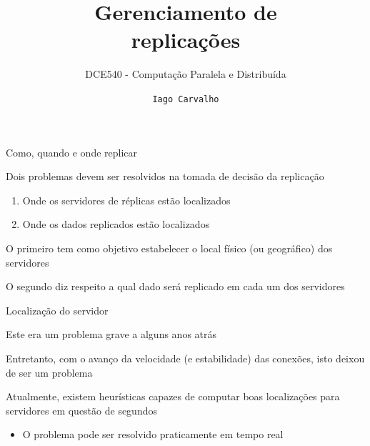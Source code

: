 \documentclass[compress]{beamer}
\title{Gerenciamento de \\ replicações}
\subtitle{DCE540 - Computação Paralela e Distribuída}
\author{\texttt{Iago Carvalho}}
\institute{\texttt{Departamento de Ciência da Computação}}
\begin{document}
\begin{frame}
\titlepage

\end{frame}


\begin{frame}{Como, quando e onde replicar}

Dois problemas devem ser resolvidos na tomada de decisão da replicação
\begin{enumerate}
    \item Onde os servidores de réplicas estão localizados
    \item Onde os dados replicados estão localizados
\end{enumerate}

\vspace{0.5cm}

O primeiro tem como objetivo estabelecer o local físico (ou geográfico) dos servidores

\vspace{0.5cm}

O segundo diz respeito a qual dado será replicado em cada um dos servidores

\end{frame}


\begin{frame}{Localização do servidor}

Este era um problema grave a alguns anos atrás

\vspace{0.5cm}

Entretanto, com o avanço da velocidade (e estabilidade) das conexões, isto deixou de ser um problema

\vspace{0.5cm}

Atualmente, existem heurísticas capazes de computar boas localizações para servidores em questão de segundos
\begin{itemize}
    \item O problema pode ser resolvido praticamente em tempo real
\end{itemize}

\end{frame}

\end{document}
